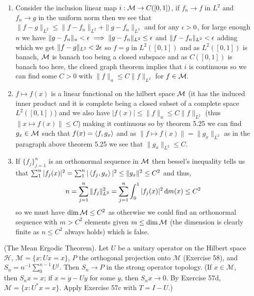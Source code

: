 \documentclass[12pt,a4paper]{article}
\begin{document}
\begin{solution}
    \begin{enumerate}[label=\alph*.]
        \item Consider the inclusion linear map $i:\mathcal{M}\to C([0,1])$, if $f_n\to f$ in $L^2$ and $f_n\to g$ in the uniform norm then we see that $\|f-g\|_{L^2}\leq\|f-f_n\|_{L^2}+\|g-f_n\|_{L^2}$ and for any $\epsilon>0$, for large enough $n$ we have $\|g-f_n\|_u<\epsilon\implies\|g-f_n\|_{L^2}\leq\epsilon$ and $\|f-f_n\|_{L^2}<\epsilon$ adding which we get $\|f-g\|_{L^2}<2\epsilon$ so $f=g$ in $L^2([0,1])$ and as $L^2([0,1])$ is banach, $\mathcal{M}$ is banach too being a closed subspace and as $C([0,1])$ is banach too here, the closed graph theorem implies that $i$ is continuous so we can find some $C>0$ with $\|f\|_u\leq C\|f\|_{L^2}$ for $f\in\mathcal{M}.$ 
        \item $f\mapsto f(x)$ is a linear functional on the hilbert space $\mathcal{M}$ (it has the induced inner product and it is complete being a closed subset of a complete space $L^2([0,1])$) and we also have $|f(x)|\leq\|f\|_u\leq C\|f\|_{L^2}$ (thus $\|x\mapsto f(x)\|\leq C$) making it continuous so by theorem 5.25 we can find $g_x\in\mathcal{M}$ such that $f(x)=\left\langle f,g_x\right\rangle$ and as $\|f\mapsto f(x)\|=\|g_x\|_{L^2}$ as in the paragraph above theorem 5.25 we see that $\|g_x\|_{L^2}\leq C.$ 
        \item If $\{f_j\}_{j=1}^n$ is an orthonormal sequence in $\mathcal{M}$ then bessel's inequality tells us that $\sum_1^n|f_j(x)|^2=\sum_1^n|\left\langle f_j,g_x\right\rangle|^2\leq\|g_x\|^2\leq C^2$ and thus, 
            \[
                n=\sum_{j=1}^n\|f_j\|_{L^2}^2=\sum_{j=1}^n\int_0^1|f_j(x)|^2\,\mathrm{d} m(x)\leq C^2
            \]
            so we must have $\dim\mathcal{M}\leq C^2$ as otherwise we could find an orthonormal sequence with $m>C^2$ elements given $m\leq\dim\mathcal{M}$ (the dimension is clearly finite as $n\leq C^2$ always holds) which is false. 
    \end{enumerate}
\end{solution}
\begin{problem}\label{prob:5-67}
(The Mean Ergodic Theorem). Let $U$ be a unitary operator on the Hilbert space $\mathcal{H}$, $\mathcal{M} = \{x : Ux = x\}$, $P$ the orthogonal projection onto $\mathcal{M}$ (Exercise 58), and $S_n = n^{-1} \sum_{0}^{n-1} U^j$. Then $S_n \rightarrow P$ in the strong operator topology. (If $x \in \mathcal{M}$, then $S_n x = x$; if $x = y - Uy$ for some $y$, then $S_n x \rightarrow 0$. By Exercise 57d, $\mathcal{M} = \{x : U^* x = x\}$. Apply Exercise 57c with $T = I - U$.)
\end{problem}
\end{document}
